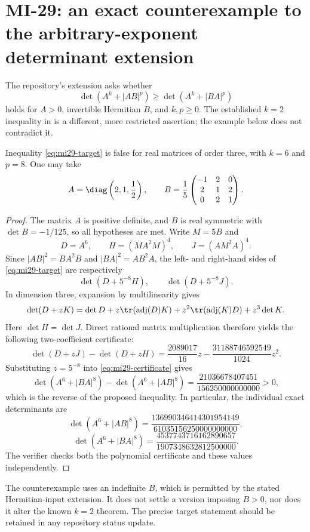 \section{MI-29: an exact counterexample to the arbitrary-exponent determinant extension}
\label{sec:mi29}
The repository's extension asks whether
\begin{equation}\label{eq:mi29-target}
 \det(A^k+|AB|^p)\geq\det(A^k+|BA|^p)
\end{equation}
holds for $A>0$, invertible Hermitian $B$, and $k,p\geq0$. The established $k=2$ inequality in \cite{GAM2020} is a different, more restricted assertion; the example below does not contradict it.

\begin{theorem}
Inequality \eqref{eq:mi29-target} is false for real matrices of order three, with $k=6$ and $p=8$. One may take
\[
 A=\diag\left(2,1,\frac12\right),\qquad
 B=\frac15\begin{pmatrix}-1&2&0\\2&1&2\\0&2&1\end{pmatrix}.
\]
\end{theorem}
\begin{proof}
The matrix $A$ is positive definite, and $B$ is real symmetric with $\det B=-1/125$, so all hypotheses are met. Write $M=5B$ and
\[
 D=A^6,\qquad H=(MA^2M)^4,\qquad J=(AM^2A)^4.
\]
Since $|AB|^2=BA^2B$ and $|BA|^2=AB^2A$, the left- and right-hand sides of \eqref{eq:mi29-target} are respectively
\[
 \det(D+5^{-8}H),\qquad\det(D+5^{-8}J).
\]
In dimension three, expansion by multilinearity gives
\[
 \det(D+zK)=\det D+z\tr(\operatorname{adj}(D)K)
   +z^2\tr(\operatorname{adj}(K)D)+z^3\det K.
\]
Here $\det H=\det J$. Direct rational matrix multiplication therefore yields the following two-coefficient certificate:
\begin{equation}\label{eq:mi29-certificate}
 \det(D+zJ)-\det(D+zH)
 =\frac{2089017}{16}z-\frac{31188746592549}{1024}z^2.
\end{equation}
Substituting $z=5^{-8}$ into \eqref{eq:mi29-certificate} gives
\[
 \det(A^6+|BA|^8)-\det(A^6+|AB|^8)
 =\frac{21036678407451}{156250000000000}>0,
\]
which is the reverse of the proposed inequality. In particular, the individual exact determinants are
\[
 \det(A^6+|AB|^8)=\frac{136990346414301954149}{61035156250000000000},
\]
\[
 \det(A^6+|BA|^8)=\frac{4537743716162890657}{1907348632812500000}.
\]
The verifier checks both the polynomial certificate and these values independently.
\end{proof}

\begin{remark}
The counterexample uses an indefinite $B$, which is permitted by the stated Hermitian-input extension. It does not settle a version imposing $B>0$, nor does it alter the known $k=2$ theorem. The precise target statement should be retained in any repository status update.
\end{remark}
